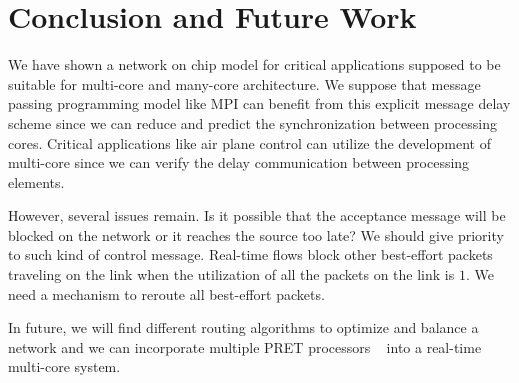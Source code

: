 \documentclass[conference, twocolumn]{IEEEtran}
\theoremstyle{definition}
\begin{document}
\section{Conclusion and Future Work}
We have shown a network on chip model for critical applications supposed to be
suitable for multi-core and many-core architecture. We suppose that message
passing programming model like MPI can benefit from this explicit message
delay scheme since we can reduce and predict the synchronization between
processing cores. Critical applications like air plane control can utilize the
development of multi-core since we can verify the delay communication between
processing elements.

However, several issues remain. Is it possible that the acceptance
message will be blocked on the network or it reaches the source too late? We should give priority to such kind of control
message. Real-time flows block other best-effort packets traveling on the link
when the utilization of all the packets on the link is $1$. We need a mechanism to
reroute all best-effort packets.

In future, we will find different routing algorithms to optimize and balance a
network and we can incorporate multiple PRET processors ~\cite{LicklyPRET} into
a real-time multi-core system.



\end{document}
